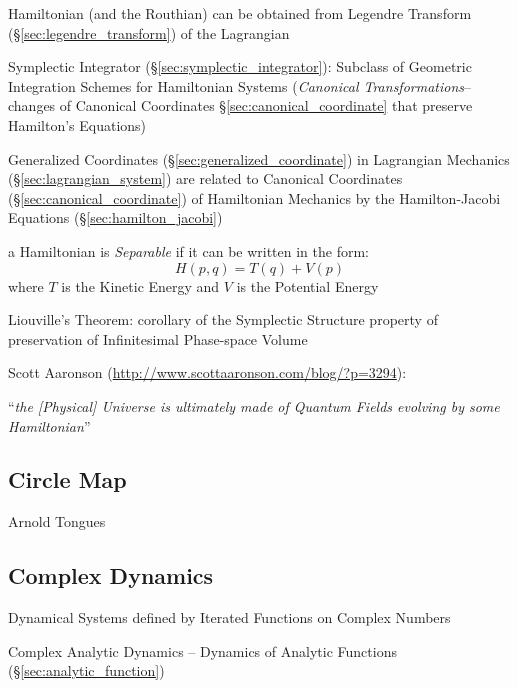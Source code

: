 Hamiltonian (and the Routhian) can be obtained from Legendre Transform
(\S\ref{sec:legendre_transform}) of the Lagrangian

\fist Symplectic Integrator (\S\ref{sec:symplectic_integrator}): Subclass of
Geometric Integration Schemes for Hamiltonian Systems (\emph{Canonical
  Transformations}-- changes of Canonical Coordinates
\S\ref{sec:canonical_coordinate} that preserve Hamilton's Equations)

Generalized Coordinates (\S\ref{sec:generalized_coordinate}) in Lagrangian
Mechanics (\S\ref{sec:lagrangian_system}) are related to Canonical Coordinates
(\S\ref{sec:canonical_coordinate}) of Hamiltonian Mechanics by the
Hamilton-Jacobi Equations (\S\ref{sec:hamilton_jacobi})

a Hamiltonian is \emph{Separable} if it can be written in the form:
\[
  H(p,q) = T(q) + V(p)
\]
where $T$ is the Kinetic Energy and $V$ is the Potential Energy

Liouville's Theorem: corollary of the Symplectic Structure property of
preservation of Infinitesimal Phase-space Volume

Scott Aaronson (\url{http://www.scottaaronson.com/blog/?p=3294}):

``\emph{the [Physical] Universe is ultimately made of Quantum Fields
  evolving by some Hamiltonian}''



\subsection{Circle Map}\label{sec:circle_map}

Arnold Tongues



\subsection{Complex Dynamics}\label{sec:complex_dynamics}

Dynamical Systems defined by Iterated Functions on Complex Numbers

Complex Analytic Dynamics -- Dynamics of Analytic Functions
(\S\ref{sec:analytic_function})

